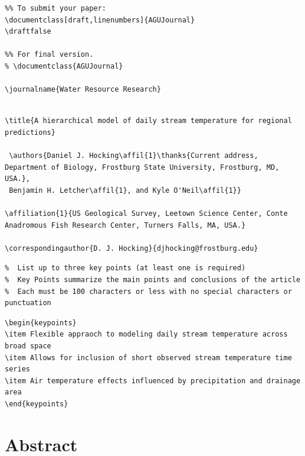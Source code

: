 \begin{verbatim}
%% To submit your paper:
\documentclass[draft,linenumbers]{AGUJournal}
\draftfalse

%% For final version.
% \documentclass{AGUJournal}

\journalname{Water Resource Research}


\end{verbatim}

\begin{verbatim}
\title{A hierarchical model of daily stream temperature for regional predictions}

 \authors{Daniel J. Hocking\affil{1}\thanks{Current address, Department of Biology, Frostburg State University, Frostburg, MD, USA.},
 Benjamin H. Letcher\affil{1}, and Kyle O'Neil\affil{1}}

\affiliation{1}{US Geological Survey, Leetown Science Center, Conte Anadromous Fish Research Center, Turners Falls, MA, USA.}

\correspondingauthor{D. J. Hocking}{djhocking@frostburg.edu}
\end{verbatim}

\begin{verbatim}
%  List up to three key points (at least one is required)
%  Key Points summarize the main points and conclusions of the article
%  Each must be 100 characters or less with no special characters or punctuation 
\end{verbatim}

\begin{verbatim}
\begin{keypoints}
\item Flexible appraoch to modeling daily stream temperature across broad space
\item Allows for inclusion of short observed stream temperature time series
\item Air temperature effects influenced by precipitation and drainage area
\end{keypoints}
\end{verbatim}

\section{Abstract}\label{abstract}

